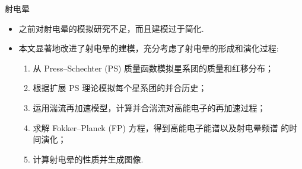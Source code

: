 \documentclass{beamer}
\begin{document}
\begin{frame}{射电晕}
  \begin{itemize}
  \item 之前对射电晕的模拟研究不足，而且建模过于简化.
  \item 本文显著地改进了射电晕的建模，充分考虑了射电晕的形成和演化过程:
    \begin{enumerate}
      \item 从 Press--Schechter (PS) 质量函数模拟星系团的质量和红移分布；
      \item 根据扩展 PS 理论模拟每个星系团的并合历史；
      \item 运用湍流再加速模型，计算并合湍流对高能电子的再加速过程；
      \item 求解 Fokker--Planck (FP) 方程，得到高能电子能谱以及射电晕频谱
        的时间演化；
      \item 计算射电晕的性质并生成图像.
    \end{enumerate}
  \end{itemize}
\end{frame}
\end{document}
